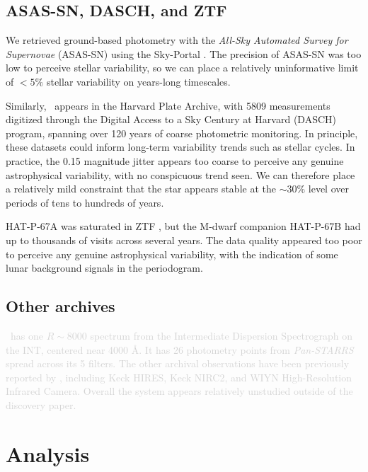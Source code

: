\documentclass[twocolumn]{aastex631}
\newcommand{\hatp}{\object{HAT-P-67}~}
\begin{document}
\subsection{ASAS-SN, DASCH, and ZTF}
We retrieved ground-based photometry with the \emph{All-Sky Automated Survey for Supernovae} (ASAS-SN) using the Sky-Portal \citep{shappee14,2017PASP..129j4502K}.  The precision of ASAS-SN was too low to perceive stellar variability, so we can place a relatively uninformative limit of $<5\%$ stellar variability on years-long timescales.

Similarly, \hatp appears in the Harvard Plate Archive, with 5809 measurements digitized through the Digital Access to a Sky Century at Harvard (DASCH) program, spanning over 120 years of coarse photometric monitoring.  In principle, these datasets could inform long-term variability trends such as stellar cycles.  In practice, the 0.15 magnitude jitter appears too coarse to perceive any genuine astrophysical variability, with no conspicuous trend seen.  We can therefore place a relatively mild constraint that the star appears stable at the $\sim30\%$ level over periods of tens to hundreds of years.

HAT-P-67A was saturated in ZTF \citep{2019PASP..131a8002B}, but the M-dwarf companion HAT-P-67B had up to thousands of visits across several years.  The data quality appeared too poor to perceive any genuine astrophysical variability, with the indication of some lunar background signals in the periodogram.

\subsection{Other archives}
\textcolor{lightgray}{\hatp has one $R\sim8000$ spectrum from the Intermediate Dispersion Spectrograph on the INT, centered near 4000 \AA.  It has 26 photometry points from \emph{Pan-STARRS} spread across its 5 filters.  The other archival observations have been previously reported by \citet{2017AJ....153..211Z}, including Keck HIRES, Keck NIRC2, and WIYN High-Resolution Infrared Camera.  Overall the system appears relatively unstudied outside of the discovery paper.}


\section{Analysis}
\end{document}
